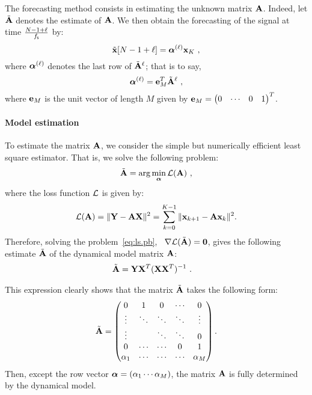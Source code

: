 The forecasting method consists in estimating the unknown matrix ${\mathbf A}$. Indeed, let $\tilde{{\mathbf A}}$ denotes the estimate of ${\mathbf A}$. We then obtain the forecasting of the signal at time $\frac{N-1+\ell}{f_{\mathsf s}}$ by:
\begin{equation}
\label{eq:prediction}
\tilde \bx [N-1+\ell] = \balpha^{(\ell)}\bx_{K}\ ,
\end{equation}  
where $\boldsymbol{\alpha}^{(\ell)}$ denotes the last row of $\tilde{{\mathbf A}}^\ell$; that is to say,
\begin{equation}
\balpha^{(\ell)}=\be_M^T\tilde\bA^\ell\ ,
\label{eq:alpha.l}
\end{equation}
where ${\mathbf e}_M$ is the unit vector of length $M$ given by ${\mathbf e}_M = \begin{pmatrix} 0 & \cdots & 0 & 1\end{pmatrix}^T$.

\paragraph{Model estimation} To estimate the matrix ${\mathbf A}$, we consider the simple but numerically efficient least square estimator. That is, we solve the following problem:
\begin{equation}
\label{eq:ls.pb}
\tilde\bA = \arg\min_{\balpha} \cL(\bA)\ ,
\end{equation}
where the loss function ${\mathcal L}$ is given by:
\[
{\mathcal L}({\mathbf A}) = \|{\mathbf Y}-{\mathbf A}{\mathbf X}\|^2 = \sum_{k=0}^{K-1} \|{\mathbf x}_{k+1}-{\mathbf A}{\mathbf x}_k\|^2.
\]
Therefore, solving the problem~\eqref{eq:ls.pb}, \ie~$\nabla {\mathcal L}(\tilde{{\mathbf A}})=\boldsymbol{0}$, gives the following estimate $\tilde{{\mathbf A}}$ of the dynamical model matrix ${\mathbf A}$:
\begin{align}
\tilde\bA &= \bY\bX^T(\bX\bX^T)^{-1}\ .
\label{eq:lse}
\end{align}

\begin{remark}
This expression clearly shows that the matrix $\tilde{{\mathbf A}}$ takes the following form:
\[
\tilde{{\mathbf A}} =
\begin{pmatrix}
0       & 1       & 0      & \cdots & 0      \\
\vdots  & \ddots  & \ddots & \ddots & \vdots  \\
\vdots  &         & \ddots & \ddots & 0  \\
0       & \cdots  & \cdots & 0      & 1  \\
\alpha_1& \cdots  & \cdots & \cdots & \alpha_M  \\
\end{pmatrix}.
\]
Then, except the row vector $\boldsymbol{\alpha} = \left(\alpha_1 \cdots\alpha_M\right)$, the matrix ${\mathbf A}$ is fully determined by the dynamical model.
\end{remark}

